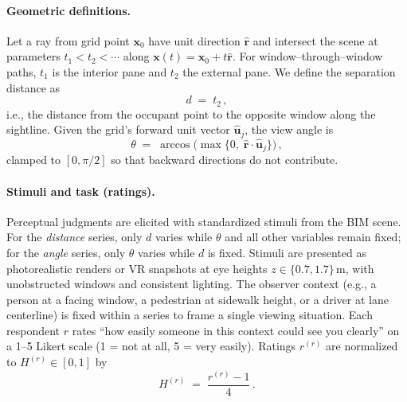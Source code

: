 \documentclass[final,3p,times,review]{elsarticle}
\begin{document}
\paragraph{Geometric definitions.}
Let a ray from grid point $\mathbf{x}_0$ have unit direction $\hat{\mathbf{r}}$ and intersect the scene at parameters $t_1<t_2<\cdots$ along $\mathbf{x}(t)=\mathbf{x}_0+t\hat{\mathbf{r}}$. For window–through–window paths, $t_1$ is the interior pane and $t_2$ the external pane. We define the separation distance as
\begin{equation}
d \;=\; t_2 \,,
\label{eq:def-distance}
\end{equation}
i.e., the distance from the occupant point to the opposite window along the sightline. Given the grid’s forward unit vector $\hat{\mathbf{u}}_j$, the view angle is
\begin{equation}
\theta \;=\; \arccos\!\big(\max\{0,\;\hat{\mathbf{r}}\!\cdot\!\hat{\mathbf{u}}_j\}\big)\,,
\label{eq:def-angle}
\end{equation}
clamped to $[0,\pi/2]$ so that backward directions do not contribute.

\paragraph{Stimuli and task (ratings).}
Perceptual judgments are elicited with standardized stimuli from the BIM scene. For the \emph{distance} series, only $d$ varies while $\theta$ and all other variables remain fixed; for the \emph{angle} series, only $\theta$ varies while $d$ is fixed. Stimuli are presented as photorealistic renders or VR snapshots at eye heights $z\in\{0.7,1.7\}$\,m, with unobstructed windows and consistent lighting. The observer context (e.g., a person at a facing window, a pedestrian at sidewalk height, or a driver at lane centerline) is fixed within a series to frame a single viewing situation. Each respondent $r$ rates “how easily someone in this context could see you clearly” on a 1–5 Likert scale (1 = not at all, 5 = very easily). Ratings $r^{(r)}$ are normalized to $H^{(r)}\in[0,1]$ by
\begin{equation}
H^{(r)} \;=\; \frac{r^{(r)}-1}{4}\,.
\label{eq:rating-normalization}
\end{equation}
\end{document}
